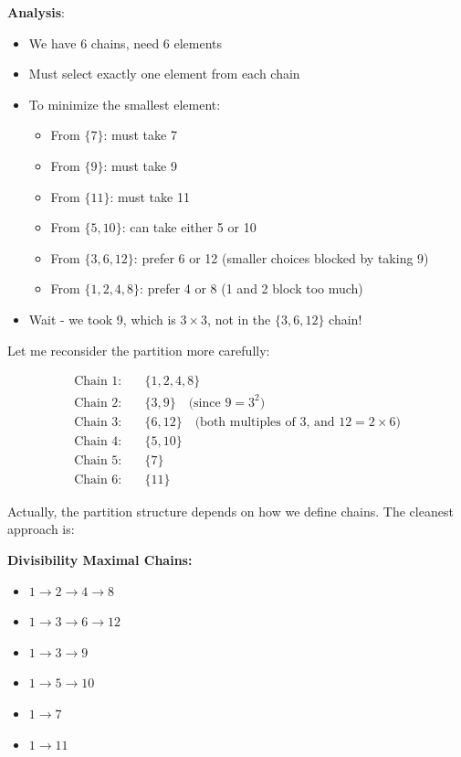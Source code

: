 \documentclass[12pt]{article}
\begin{document}
\textbf{Analysis}:
\begin{itemize}
    \item We have 6 chains, need 6 elements
    \item Must select exactly one element from each chain
    \item To minimize the smallest element:
    \begin{itemize}
        \item From $\{7\}$: must take 7
        \item From $\{9\}$: must take 9
        \item From $\{11\}$: must take 11
        \item From $\{5,10\}$: can take either 5 or 10
        \item From $\{3,6,12\}$: prefer 6 or 12 (smaller choices blocked by taking 9)
        \item From $\{1,2,4,8\}$: prefer 4 or 8 (1 and 2 block too much)
    \end{itemize}
    \item Wait - we took 9, which is $3 \times 3$, not in the $\{3,6,12\}$ chain!
\end{itemize}

Let me reconsider the partition more carefully:

\begin{align*}
\text{Chain 1:} &\quad \{1, 2, 4, 8\} \\
\text{Chain 2:} &\quad \{3, 9\} \quad \text{(since $9 = 3^2$)} \\
\text{Chain 3:} &\quad \{6, 12\} \quad \text{(both multiples of 3, and $12 = 2 \times 6$)} \\
\text{Chain 4:} &\quad \{5, 10\} \\
\text{Chain 5:} &\quad \{7\} \\
\text{Chain 6:} &\quad \{11\}
\end{align*}

Actually, the partition structure depends on how we define chains. The cleanest approach is:

\textbf{Divisibility Maximal Chains:}
\begin{itemize}
    \item $1 \to 2 \to 4 \to 8$
    \item $1 \to 3 \to 6 \to 12$
    \item $1 \to 3 \to 9$
    \item $1 \to 5 \to 10$
    \item $1 \to 7$
    \item $1 \to 11$
\end{itemize}
\end{document}
